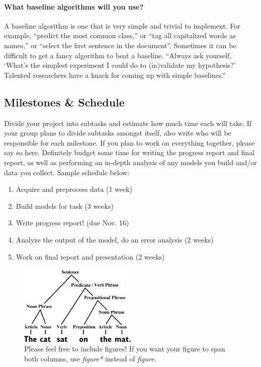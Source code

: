 \documentclass[11pt,a4paper]{article}
\begin{document}
\paragraph{What baseline algorithms will you use?}
A baseline algorithm is one that is very simple and trivial to implement. For example, “predict the most common class,” or “tag all capitalized words as names,” or “select the first sentence in the document”. Sometimes it can be difficult to get a fancy algorithm to beat a baseline. “Always ask yourself, ‘What’s the simplest experiment I could do to (in)validate my hypothesis?’ Talented researchers have a knack for coming up with simple baselines.”

\subsection{Milestones \& Schedule}
Divide your project into subtasks and estimate how much time each will take. If your group plans to divide subtasks amongst itself, also write who will be responsible for each milestone. If you plan to work on everything together, please say so here. Definitely budget some time for writing the progress report and final report, as well as performing an in-depth analysis of any models you build and/or data you collect. Sample schedule below:
\begin{enumerate}
    \item Acquire and preprocess data (1 week)
    \item Build models for task (3 weeks)
    \item Write progress report! (due Nov. 16)
    \item Analyze the output of the model, do an error analysis (2 weeks)
    \item Work on final report and presentation (2 weeks)
\end{enumerate}

\begin{figure}[t]
    \centering
    \includegraphics[width=0.5\textwidth]{figs/sentence.png}
    \caption{Please feel free to include figures! If you want your figure to span both columns, use \emph{figure*} instead of \emph{figure}.}
    \label{fig:example}
\end{figure}
\end{document}
